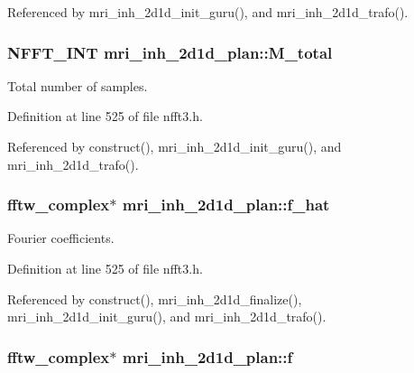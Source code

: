 Referenced by mri\-\_\-inh\-\_\-2d1d\-\_\-init\-\_\-guru(), and mri\-\_\-inh\-\_\-2d1d\-\_\-trafo().

\hypertarget{structmri__inh__2d1d__plan_a1616401cb04fe10b117cdba7fc4c1c7b}{
\subsubsection[{M\-\_\-total}]{\setlength{\rightskip}{0pt plus 5cm}N\-F\-F\-T\-\_\-\-I\-N\-T mri\-\_\-inh\-\_\-2d1d\-\_\-plan\-::\-M\-\_\-total}}\label{structmri__inh__2d1d__plan_a1616401cb04fe10b117cdba7fc4c1c7b}


Total number of samples. 



Definition at line 525 of file nfft3.\-h.



Referenced by construct(), mri\-\_\-inh\-\_\-2d1d\-\_\-init\-\_\-guru(), and mri\-\_\-inh\-\_\-2d1d\-\_\-trafo().

\hypertarget{structmri__inh__2d1d__plan_ad34c95b6390628c8fcd223b77e37e5bf}{
\subsubsection[{f\-\_\-hat}]{\setlength{\rightskip}{0pt plus 5cm}fftw\-\_\-complex$\ast$ mri\-\_\-inh\-\_\-2d1d\-\_\-plan\-::f\-\_\-hat}}\label{structmri__inh__2d1d__plan_ad34c95b6390628c8fcd223b77e37e5bf}


Fourier coefficients. 



Definition at line 525 of file nfft3.\-h.



Referenced by construct(), mri\-\_\-inh\-\_\-2d1d\-\_\-finalize(), mri\-\_\-inh\-\_\-2d1d\-\_\-init\-\_\-guru(), and mri\-\_\-inh\-\_\-2d1d\-\_\-trafo().

\hypertarget{structmri__inh__2d1d__plan_a985f125ad6a94361939572f8323872a0}{
\subsubsection[{f}]{\setlength{\rightskip}{0pt plus 5cm}fftw\-\_\-complex$\ast$ mri\-\_\-inh\-\_\-2d1d\-\_\-plan\-::f}}\label{structmri__inh__2d1d__plan_a985f125ad6a94361939572f8323872a0}



